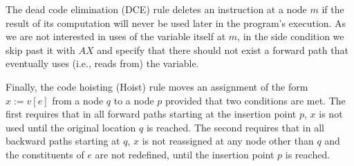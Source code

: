 The dead code elimination (DCE) rule deletes an instruction at a node $m$ if the result of its computation will never be used later in the program's execution. As we are not interested in uses of the variable itself at $m$, in the side condition we skip past it with $AX$ and specify that there should not exist a forward path that eventually uses (i.e., reads from) the variable. 

Finally, the code hoisting (Hoist) rule moves an assignment of the form $x:=v[e]$ from a node $q$ to a node $p$ provided that two conditions are met. The first requires that in all forward paths starting at the insertion point $p$, $x$ is not used until the original location $q$ is reached. The second requires that in all backward paths starting at $q$, $x$ is not reassigned at any node other than $q$ and the constituents of $e$ are not redefined, until the insertion point $p$ is reached. %